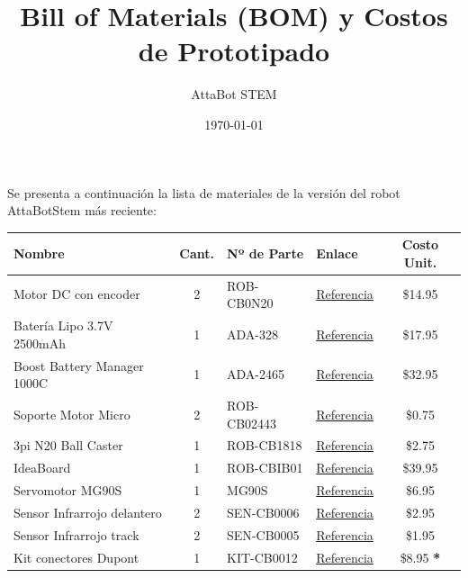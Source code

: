 \documentclass[12pt,a4paper]{article}
\title{\textbf{Bill of Materials (BOM)
y Costos de Prototipado}}
\author{AttaBot STEM}
\date{\today}
\begin{document}
\maketitle

Se presenta a continuación la lista de materiales de la versión del robot AttaBotStem más reciente: 

\begin{table}[H]
    \centering
    \renewcommand{\arraystretch}{1.2}
    \begin{threeparttable}
    \begin{tabularx}{\textwidth}{@{} l c l X c @{}}
        \toprule
        \textbf{Nombre} & \textbf{Cant.} & \textbf{Nº de Parte} & \textbf{Enlace} & \textbf{Costo Unit.} \\
        \midrule
        Motor DC con encoder & 2 & ROB-CB0N20 & \href{https://www.crcibernetica.com/n20-gearmotor-with-encoder-and-wheel/}{Referencia} & \$14.95 \\
        Batería Lipo 3.7V 2500mAh & 1 & ADA-328 & \href{https://www.crcibernetica.com/lithium-ion-polymer-battery-3-7v-2500mah/}{Referencia} & \$17.95 \\
        Boost Battery Manager 1000C & 1 & ADA-2465 & \href{https://www.crcibernetica.com/powerboost-1000-charger-rechargeable-5v-lipo-usb-boost-1a-1000c/}{Referencia} & \$32.95 \\
        Soporte Motor Micro & 2 & ROB-CB02443 & \href{https://www.crcibernetica.com/micro-gearmotor-support-bracket/}{Referencia} & \$0.75 \\
        3pi N20 Ball Caster & 1 & ROB-CB1818 & \href{https://www.crcibernetica.com/3pi-n20-ball-caster/}{Referencia} & \$2.75 \\
        IdeaBoard & 1 & ROB-CBIB01 & \href{https://www.crcibernetica.com/crcibernetica-ideaboard/}{Referencia} & \$39.95 \\
        Servomotor MG90S & 1 & MG90S & \href{https://www.crcibernetica.com/mg90s-micro-servo-with-metal-gears/}{Referencia} & \$6.95 \\
        Sensor Infrarrojo delantero & 2 & SEN-CB0006 & \href{https://www.crcibernetica.com/infrared-obstacle-avoidance-module/}{Referencia} & \$2.95 \\
        Sensor Infrarrojo track & 2 & SEN-CB0005 & \href{https://www.crcibernetica.com/track-sensor-module/}{Referencia} & \$1.95 \\
        Kit conectores Dupont & 1 & KIT-CB0012 & \href{https://www.crcibernetica.com/dupont-connector-assorted-kit/}{Referencia} & \$8.95 \textbf{*} \\

\end{tabularx}
\end{threeparttable}
\end{table}
\end{document}
